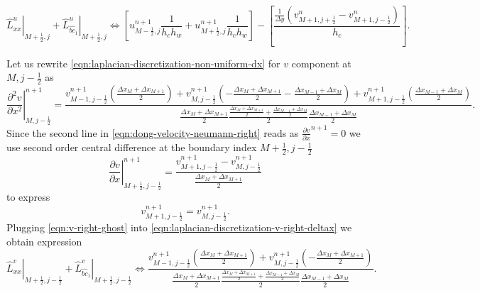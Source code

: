 \documentclass{article}
\numberwithin{equation}{section}
\begin{document}
\begin{equation}
	\left.\hat{L}^u_{xx}\right|_{M+\frac{1}{2},j}+\left.\hat{L}^u_{\hat{bc}_1}\right|_{M+\frac{1}{2},j}
	\iff 
	\left[u^{n+1}_{M-\frac{1}{2},j}\frac{1}{h_c h_w}
	+u^{n+1}_{M+\frac{1}{2},j}\frac{1}{h_c h_w}\right]
	-\left[\frac{\frac{1}{\Delta y}\left( v^n_{M+1,j+\frac{1}{2}}-v^n_{M+1,j-\frac{1}{2}} \right)}{h_c}\right].
\end{equation}


Let us rewrite \cref{eqn:laplacian-discretization-non-uniform-dx} for $v$ component at $M,j-\frac{1}{2}$ as
\begin{equation}\label{eqn:laplacian-discretization-v-right-deltax}
\left.\frac{\partial^2 v}{\partial x^2}\right|^{n+1}_{M,j-\frac{1}{2}}=
\frac{
	v^{n+1}_{M-1,j-\frac{1}{2}}\left(\frac{\Delta x_M + \Delta x_{M+1}}{2}\right)
	+v^{n+1}_{M,j-\frac{1}{2}}\left(-\frac{\Delta x_M + \Delta x_{M+1}}{2}-\frac{\Delta x_{M-1} + \Delta x_{M}}{2}\right)
	+v^{n+1}_{M+1,j-\frac{1}{2}}\left(\frac{\Delta x_{M-1} + \Delta x_M}{2}\right)
}
{\frac{\Delta x_{M} + \Delta x_{M+1}}{2} \frac{\frac{\Delta x_M + \Delta x_{M+1}}{2}+\frac{\Delta x_{M-1} + \Delta x_{M}}{2}}{2} \frac{\Delta x_{M-1} + \Delta x_M}{2}}.
\end{equation}
Since the second line in \cref{eqn:dong-velocity-neumann-right} reads as $\frac{\partial v}{\partial x}^{n+1}=0$ we use second order central difference at the boundary index $M+\frac{1}{2},j-\frac{1}{2}$
\begin{equation}
	\left.\frac{\partial v}{\partial x}\right|^{n+1}_{M+\frac{1}{2},j-\frac{1}{2}}=\frac{v^{n+1}_{M+1,j-\frac{1}{2}}-v^{n+1}_{M,j-\frac{1}{2}}}{\frac{\Delta x_{M} + \Delta x_{M+1}}{2}}
\end{equation}
to express 
\begin{equation}\label{eqn:v-right-ghost}
	v^{n+1}_{M+1,j-\frac{1}{2}}=v^{n+1}_{M,j-\frac{1}{2}}.
\end{equation}
Plugging \cref{eqn:v-right-ghost} into \cref{eqn:laplacian-discretization-v-right-deltax} we obtain expression
\begin{equation}\label{eqn:laplacian-v-right-delta}
	\left.\hat{L}^v_{xx}\right|_{M+\frac{1}{2},j-\frac{1}{2}}+\left.\hat{L}^v_{\hat{bc}_1}\right|_{M+\frac{1}{2},j-\frac{1}{2}}
	\iff 
	\frac{
	v^{n+1}_{M-1,j-\frac{1}{2}}\left(\frac{\Delta x_M + \Delta x_{M+1}}{2}\right)
	+v^{n+1}_{M,j-\frac{1}{2}}\left(-\frac{\Delta x_M + \Delta x_{M+1}}{2}\right)
}
{\frac{\Delta x_{M} + \Delta x_{M+1}}{2} \frac{\frac{\Delta x_M + \Delta x_{M+1}}{2}+\frac{\Delta x_{M-1} + \Delta x_{M}}{2}}{2} \frac{\Delta x_{M-1} + \Delta x_M}{2}}.
\end{equation}
\end{document}
